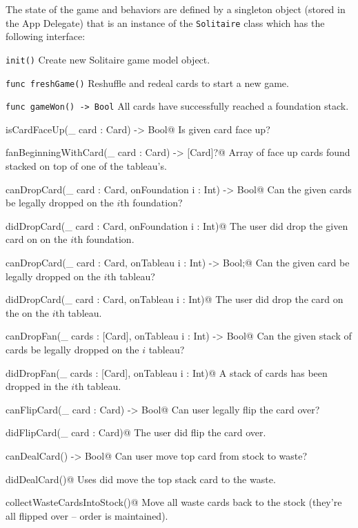 \documentclass[11pt]{article}
\begin{document}
The state of the game and behaviors are defined  by a singleton object
(stored in the App Delegate) that is an instance of the {\tt Solitaire}
class which has the following interface:
\begin{description}
\item{\tt init()} Create new Solitaire game model object.
\item{\tt func freshGame()} Reshuffle and redeal cards to start a new game. 
\item{\tt func gameWon() -> Bool} All cards have successfully reached a foundation stack. 
\item{\verb@func isCardFaceUp(_ card : Card) -> Bool@} Is given card face up? 
\item{\verb@func fanBeginningWithCard(_ card : Card) -> [Card]?@} Array of face up
   cards found stacked on top of one of the tableau's. 
\item{\verb@func canDropCard(_ card : Card, onFoundation i : Int) -> Bool@}  Can the given
  cards be legally dropped on the $i$th foundation?
\item{\verb@func didDropCard(_ card : Card, onFoundation i : Int)@} The user did drop
  the given card on on the $i$th foundation.
\item{\verb@func canDropCard(_ card : Card, onTableau i : Int) -> Bool;@} Can the given card
  be legally dropped on the $i$th tableau?
\item{\verb@func didDropCard(_ card : Card, onTableau i : Int)@} The user did drop
  the card on the on the $i$th tableau.
\item{\verb@func canDropFan(_ cards : [Card], onTableau i : Int) -> Bool@} Can the given 
  stack of cards be legally dropped on the $i$ tableau?
\item{\verb@func didDropFan(_ cards : [Card], onTableau i : Int)@} A stack of
  cards has been dropped in the $i$th tableau.
\item{\verb@func canFlipCard(_ card : Card) -> Bool@} Can user legally flip the card over?
\item{\verb@func didFlipCard(_ card : Card)@} The user did flip the card over.
\item{\verb@func canDealCard() -> Bool@} Can user move top card from stock to waste?
\item{\verb@func didDealCard()@} Uses did move the top stack card to the waste.
\item{\verb@func collectWasteCardsIntoStock()@} Move all waste cards back to
  the stock (they're all flipped over -- order is maintained).
\end{description}
\end{document}
